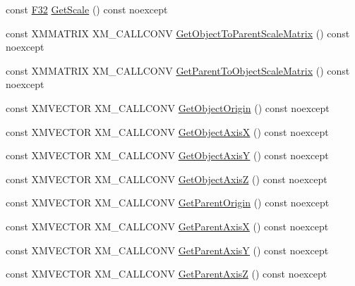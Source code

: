 \begin{DoxyCompactItemize}
\item 
const \mbox{\hyperlink{namespacemage_aa97e833b45f06d60a0a9c4fc22ae02c0}{F32}} \mbox{\hyperlink{classmage_1_1_s1_e_t_transform3_d_a3039b877cf01b6ce1ca12f5eab0319ae}{Get\+Scale}} () const noexcept
\item 
const X\+M\+M\+A\+T\+R\+IX X\+M\+\_\+\+C\+A\+L\+L\+C\+O\+NV \mbox{\hyperlink{classmage_1_1_s1_e_t_transform3_d_a07ae1d90ea04dce29b90ef8d2cc35f5b}{Get\+Object\+To\+Parent\+Scale\+Matrix}} () const noexcept
\item 
const X\+M\+M\+A\+T\+R\+IX X\+M\+\_\+\+C\+A\+L\+L\+C\+O\+NV \mbox{\hyperlink{classmage_1_1_s1_e_t_transform3_d_a9129bdf35b05eac0e949be6cd1834923}{Get\+Parent\+To\+Object\+Scale\+Matrix}} () const noexcept
\item 
const X\+M\+V\+E\+C\+T\+OR X\+M\+\_\+\+C\+A\+L\+L\+C\+O\+NV \mbox{\hyperlink{classmage_1_1_s1_e_t_transform3_d_ab19a865b63749d63a1a7028664ead61d}{Get\+Object\+Origin}} () const noexcept
\item 
const X\+M\+V\+E\+C\+T\+OR X\+M\+\_\+\+C\+A\+L\+L\+C\+O\+NV \mbox{\hyperlink{classmage_1_1_s1_e_t_transform3_d_af55ca75f9b573da16a88951616f1e9ab}{Get\+Object\+AxisX}} () const noexcept
\item 
const X\+M\+V\+E\+C\+T\+OR X\+M\+\_\+\+C\+A\+L\+L\+C\+O\+NV \mbox{\hyperlink{classmage_1_1_s1_e_t_transform3_d_ad9cfdad18af96c0309461d173dbb4f8b}{Get\+Object\+AxisY}} () const noexcept
\item 
const X\+M\+V\+E\+C\+T\+OR X\+M\+\_\+\+C\+A\+L\+L\+C\+O\+NV \mbox{\hyperlink{classmage_1_1_s1_e_t_transform3_d_ac4e2a9392d2d3b6b5dd4364be9df0cda}{Get\+Object\+AxisZ}} () const noexcept
\item 
const X\+M\+V\+E\+C\+T\+OR X\+M\+\_\+\+C\+A\+L\+L\+C\+O\+NV \mbox{\hyperlink{classmage_1_1_s1_e_t_transform3_d_a2b012cb8746fcfa59c3edc59ebc658e8}{Get\+Parent\+Origin}} () const noexcept
\item 
const X\+M\+V\+E\+C\+T\+OR X\+M\+\_\+\+C\+A\+L\+L\+C\+O\+NV \mbox{\hyperlink{classmage_1_1_s1_e_t_transform3_d_a85f0aed785c1ad27885ea6602d50c893}{Get\+Parent\+AxisX}} () const noexcept
\item 
const X\+M\+V\+E\+C\+T\+OR X\+M\+\_\+\+C\+A\+L\+L\+C\+O\+NV \mbox{\hyperlink{classmage_1_1_s1_e_t_transform3_d_ac5e516aa2d019edd6594fa1c7f501f20}{Get\+Parent\+AxisY}} () const noexcept
\item 
const X\+M\+V\+E\+C\+T\+OR X\+M\+\_\+\+C\+A\+L\+L\+C\+O\+NV \mbox{\hyperlink{classmage_1_1_s1_e_t_transform3_d_a8d2b254951acef7b601d7aa848552b01}{Get\+Parent\+AxisZ}} () const noexcept

\end{DoxyCompactItemize}
